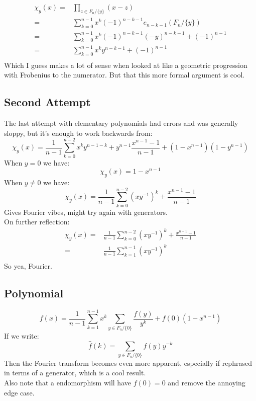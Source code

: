 \begin{equation*}
\begin{aligned}
\chi_y(x) =& \prod_{z\in F_n/\{y\}}(x-z)\\
=&\sum_{k=0}^{n-1}x^k(-1)^{n-k-1}e_{n-k-1}(F_n/\{y\})\\
=&\sum_{k=0}^{n-1}x^k(-1)^{n-k-1}(-y)^{n-k-1}+(-1)^{n-1}\\
=&\sum_{k=0}^{n-1}x^ky^{n-k-1}+(-1)^{n-1}\\
\end{aligned}
\end{equation*}
Which I guess makes a lot of sense when looked at like a geometric progression with
Frobenius to the numerator.
But that this more formal argument is cool.

\subsection{Second Attempt}
The last attempt with elementary polynomials had errors and was generally sloppy,
but it's enough to work backwards from:
\[\chi_y(x) = \frac{1}{n-1}\sum_{k=0}^{n-2}x^ky^{n-1-k}+y^{n-1}\frac{x^{n-1}-1}{n-1}+(1-x^{n-1})(1-y^{n-1})\]
When $y=0$ we have:
\[\chi_y(x) = 1-x^{n-1}\]
When $y\neq 0$ we have:
\[\chi_y(x) = \frac{1}{n-1}\sum_{k=0}^{n-2}(xy^{-1})^k+\frac{x^{n-1}-1}{n-1}\]
Gives Fourier vibes, might try again with generators.
\\

On further reflection:
\begin{equation*}
\begin{aligned}
	\chi_y(x) =& \frac{1}{n-1}\sum_{k=0}^{n-2}(xy^{-1})^k+\frac{x^{n-1}-1}{n-1}\\
	=& \frac{1}{n-1}\sum_{k=1}^{n-1}(xy^{-1})^k\\
\end{aligned}
\end{equation*}
So yea, Fourier.

\subsection{Polynomial}
\[f(x) = \frac{1}{n-1}\sum_{k=1}^{n-1}x^k\sum_{y\in F_n/\{0\}}\frac{f(y)}{y^k}+f(0)(1-x^{n-1})\]
If we write:
\[\hat{f}(k)=\sum_{y\in F_n/\{0\}}f(y)y^{-k}\]
Then the Fourier transform becomes even more apparent,
especially if rephrased in terms of a generator,
which is a cool result.
\\

Also note that a endomorphism will have $f(0)=0$ and remove the annoying edge case.
